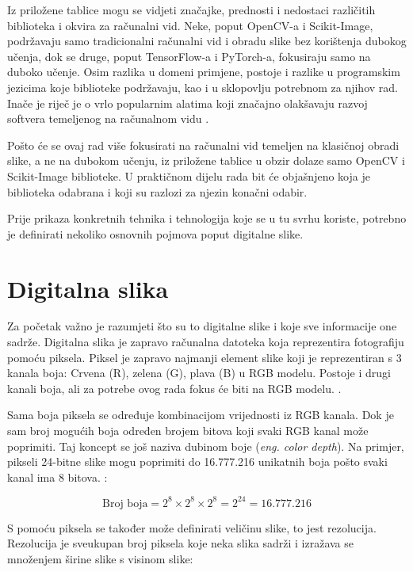 \documentclass{foi}
\begin{document}
Iz priložene tablice mogu se vidjeti značajke, prednosti i nedostaci različitih biblioteka i okvira za računalni vid. Neke, poput OpenCV-a i Scikit-Image, podržavaju samo tradicionalni računalni vid i obradu slike bez korištenja dubokog učenja, dok se druge, poput TensorFlow-a i PyTorch-a, fokusiraju samo na duboko učenje. Osim razlika u domeni primjene, postoje i razlike u programskim jezicima koje biblioteke podržavaju, kao i u sklopovlju potrebnom za njihov rad. Inače je riječ je o vrlo popularnim alatima koji značajno olakšavaju razvoj softvera temeljenog na računalnom vidu \cite{Saiwa2024Nov}.

Pošto će se ovaj rad više fokusirati na računalni vid temeljen na klasičnoj obradi slike, a ne na dubokom učenju, iz priložene tablice u obzir dolaze samo OpenCV i Scikit-Image biblioteke. U praktičnom dijelu rada bit će objašnjeno koja je biblioteka odabrana i koji su razlozi za njezin konačni odabir.

Prije prikaza konkretnih tehnika i tehnologija koje se u tu svrhu koriste, potrebno je definirati nekoliko osnovnih pojmova poput digitalne slike.

\section{Digitalna slika}

Za početak važno je razumjeti što su to digitalne slike i koje sve informacije one sadrže. Digitalna slika je zapravo računalna datoteka koja reprezentira fotografiju pomoću piksela. Piksel je zapravo najmanji element slike koji je reprezentiran s 3 kanala boja: Crvena (R), zelena (G), plava (B) u RGB modelu. Postoje i drugi kanali boja, ali za potrebe ovog rada fokus će biti na RGB modelu. \cite{DigitalnaSlika}.

Sama boja piksela se određuje kombinacijom vrijednosti iz RGB kanala. Dok je sam broj mogućih boja određen brojem bitova koji svaki RGB kanal može poprimiti. Taj koncept se još naziva dubinom boje (\textit{eng. color depth}). Na primjer, pikseli 24-bitne slike mogu poprimiti do 16.777.216 unikatnih boja pošto svaki kanal ima 8 bitova. \cite{DigitalnaSlika}:

\[
\text{Broj boja} = 2^{8} \times 2^{8} \times 2^{8} = 2^{24} = 16.777.216
\]

S pomoću piksela se također može definirati veličinu slike, to jest rezolucija. Rezolucija je sveukupan broj piksela koje neka slika sadrži i izražava se množenjem širine slike s visinom slike:
\end{document}
